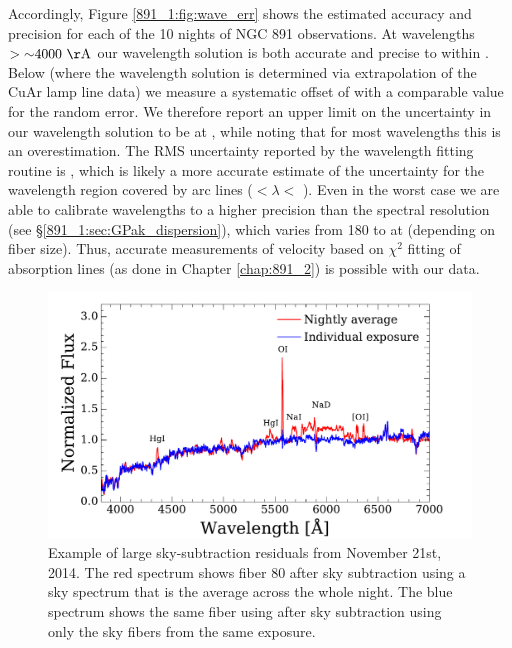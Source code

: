 Accordingly, Figure \ref{891_1:fig:wave_err} shows the estimated
accuracy and precision for each of the 10 nights of NGC 891
observations.  At wavelengths $>\val{\asim 4000}{\AA}$ our wavelength
solution is both accurate and precise to within . Below  (where the wavelength solution is
determined via extrapolation of the CuAr lamp line data) we measure a
systematic offset of  with a comparable value for
the random error. We therefore report an upper limit on the
uncertainty in our wavelength solution to be  at
, while noting that for most wavelengths this is an
overestimation.  The RMS uncertainty reported by the wavelength
fitting routine is , which is likely a more
accurate estimate of the uncertainty for the wavelength region covered
by arc lines ($<\lambda <$ ).  Even in
the worst case we are able to calibrate wavelengths to a higher
precision than the spectral resolution (see
\S\ref{891_1:sec:GPak_dispersion}), which varies from 180 to
 at  (depending on fiber size). Thus,
accurate measurements of velocity based on $\chi^2$ fitting of
absorption lines (as done in Chapter \ref{chap:891_2}) is possible
with our data.



\begin{figure}
  \centering
  \includegraphics[width=\columnwidth]{891_1/figs/skysub_comp.pdf}
  \caption[Sky subtraction example]{\label{891_1:fig:skysub_comp}\fixspacing Example of large
    sky-subtraction residuals from November 21st, 2014. The red
    spectrum shows fiber 80 after sky subtraction using a sky spectrum
    that is the average across the whole night. The blue spectrum
    shows the same fiber using after sky subtraction using only the
    sky fibers from the same exposure.}
\end{figure}

